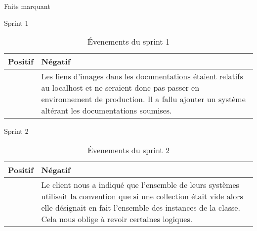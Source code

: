 \documentclass[]{article}
\begin{document}
{\begin{section}{Faits marquant}
    \begin{subsection}{Sprint 1}
        \begin{table}[H]
            \caption{Évenements du sprint 1}
            \begin{tabularx}{\columnwidth}{|X|X|}
                \hline
                \cellcolor[HTML]{17FF00}Positif & \cellcolor[HTML]{FF2D00}Négatif\\
                \hline
                 & Les liens d'images dans les documentations étaient relatifs au localhost et ne seraient donc pas passer en environnement de production. Il a fallu ajouter un système altérant les documentations soumises.\\
                \hline
            \end{tabularx}
        \end{table}
    \end{subsection}

    \begin{subsection}{Sprint 2}
        \begin{table}[H]
            \caption{Évenements du sprint 2}
            \begin{tabularx}{\columnwidth}{|X|X|}
                \hline
                \cellcolor[HTML]{17FF00}Positif & \cellcolor[HTML]{FF2D00}Négatif\\
                \hline
                 & Le client nous a indiqué que l'ensemble de leurs systèmes utilisait la convention que si une collection était vide alors elle désignait en fait l'ensemble des instances de la classe. Cela nous oblige à revoir certaines logiques.\\
                \hline
            \end{tabularx}
        \end{table}
    \end{subsection}


\end{section}}
\end{document}
